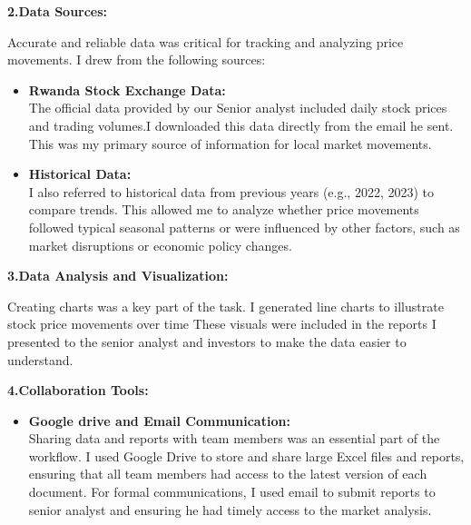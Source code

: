 \documentclass{article}
\begin{document}
\begin{titlepage}
\begin{titlepage}
\begin{flushleft}
\begin{itemize}
\end{itemize}
\vspace{0.4cm}

\textbf{2.Data Sources:}
\vspace{0.2cm}

Accurate and reliable data was critical for tracking and analyzing price movements. I drew from the following sources:
\begin{itemize}
    \item \textbf{Rwanda Stock Exchange Data:}
    \\
    The official data provided by our Senior analyst included daily stock prices and trading volumes.I downloaded this data directly from the email he sent. This was my primary source of information for local market movements.
    \item \textbf{Historical Data:}
    \\
    I also referred to historical data from previous years (e.g., 2022, 2023) to compare trends. This allowed me to analyze whether price movements followed typical seasonal patterns or were influenced by other factors, such as market disruptions or economic policy changes.
\end{itemize}


\setcounter{page}{11}


\textbf{3.Data Analysis and Visualization:}
\vspace{0.2cm}

Creating charts  was a key part of the task. I generated line charts to illustrate stock price movements over time These visuals were included in the reports I presented to the senior analyst and investors to make the data easier to understand.
\vspace{0.5cm}

\textbf{4.Collaboration Tools:}
\begin{itemize}
    \item \textbf{Google drive and Email Communication:}
    \\
    Sharing data and reports with team members was an essential part of the workflow. I used Google Drive to store and share large Excel files and reports, ensuring that all team members had access to the latest version of each document. For formal communications, I used email to submit reports to senior analyst and  ensuring he had timely access to the market analysis.
\end{itemize}
\vspace{0.3cm}


\end{flushleft}
\end{titlepage}
\end{titlepage}
\end{document}
